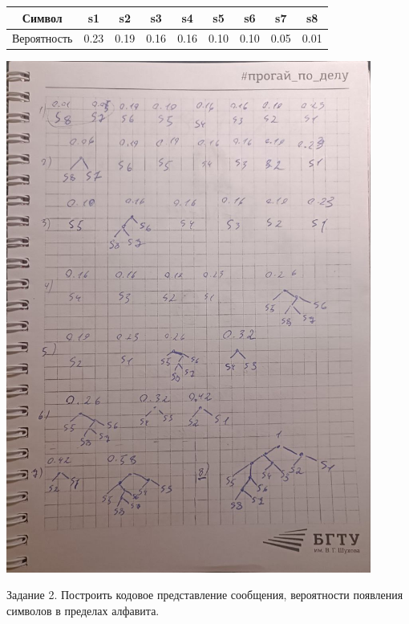 \documentclass[a4paper,14pt]{extarticle}
\begin{document}
\begin{center}
    \begin{tabular}{|c|c|c|c|c|c|c|c|c|}
        \hline
        Символ      & s1   & s2   & s3   & s4   & s5   & s6   & s7   & s8   \\
        \hline
        Вероятность & 0.23 & 0.19 & 0.16 & 0.16 & 0.10 & 0.10 & 0.05 & 0.01 \\
        \hline
    \end{tabular}
    \includegraphics[width=120mm]{task1.jpg}\\
\end{center}
Задание 2. Построить кодовое представление сообщения, вероятности
появления символов в пределах алфавита.\\
\end{document}
